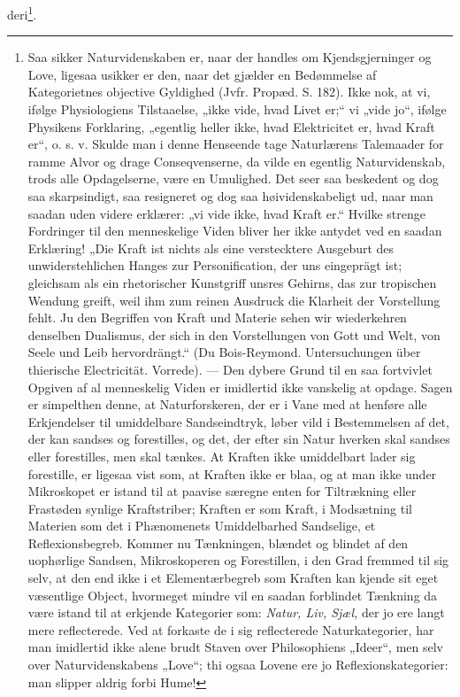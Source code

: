 \documentclass[12pt,a4paper]{book}
\begin{document}
deri\footnote{Saa sikker Naturvidenskaben er, naar der handles om
Kjendsgjerninger og Love, ligesaa usikker er den, naar det gjælder en
Bedømmelse af Kategorietnes objective Gyldighed (Jvfr. Propæd. S. 182).
Ikke nok, at vi, ifølge Physiologiens Tilstaaelse, „ikke vide, hvad
Livet er;“ vi „vide jo“, ifølge Physikens Forklaring, „egentlig heller
ikke, hvad Elektricitet er, hvad Kraft er“, o. s. v. Skulde man i denne
Henseende tage Naturlærens Talemaader for ramme Alvor og drage
Conseqvenserne, da vilde en egentlig Naturvidenskab, trods alle
Opdagelserne, være en Umulighed. Det seer saa beskedent og dog saa
skarpsindigt, saa resigneret og dog saa høividenskabeligt ud, naar man
saadan uden videre erklærer: „vi vide ikke, hvad Kraft er.“ Hvilke
strenge Fordringer til den menneskelige Viden bliver her ikke antydet
ved en saadan Erklæring! „Die Kraft ist nichts als eine verstecktere
Ausgeburt des unwiderstehlichen Hanges zur Personification, der uns
eingeprägt ist; gleichsam als ein rhetorischer Kunstgriff unsres
Gehirns, das zur tropischen Wendung greift, weil ihm zum reinen Ausdruck
die Klarheit der Vorstellung fehlt. Ju den Begriffen von Kraft und
Materie sehen wir wiederkehren denselben Dualismus, der sich in den
Vorstellungen von Gott und Welt, von Seele und Leib hervordrängt.“ (Du
Bois-Reymond. Untersuchungen über thierische Electricität. Vorrede). ---
Den dybere Grund til en saa fortvivlet Opgiven af al menneskelig Viden
er imidlertid ikke vanskelig at opdage. Sagen er simpelthen denne, at
Naturforskeren, der er i Vane med at henføre alle Erkjendelser til
umiddelbare Sandseindtryk, løber vild i Bestemmelsen af det, der kan
sandses og forestilles, og det, der efter sin Natur hverken skal sandses
eller forestilles, men skal tænkes. At Kraften ikke umiddelbart lader
sig forestille, er ligesaa vist som, at Kraften ikke er blaa, og at man
ikke under Mikroskopet er istand til at paavise særegne enten for
Tiltrækning eller Frastøden synlige Kraftstriber; Kraften er som Kraft,
i Modsætning til Materien som det i Phænomenets Umiddelbarhed
Sandselige, et Reflexionsbegreb. Kommer nu Tænkningen, blændet og
blindet af den uophørlige Sandsen, Mikroskoperen og Forestillen, i den
Grad fremmed til sig selv, at den end ikke i et Elementærbegreb som
Kraften kan kjende sit eget væsentlige Object, hvormeget mindre vil en
saadan forblindet Tænkning da være istand til at erkjende Kategorier
som: \emph{Natur, Liv, Sjæl,} der jo ere langt mere reflecterede. Ved at
forkaste de i sig reflecterede Naturkategorier, har man imidlertid ikke
alene brudt Staven over Philosophiens „Ideer“, men selv over
Naturvidenskabens „Love“; thi ogsaa Lovene ere jo Reflexionskategorier:
man slipper aldrig forbi Hume!}.
\end{document}
